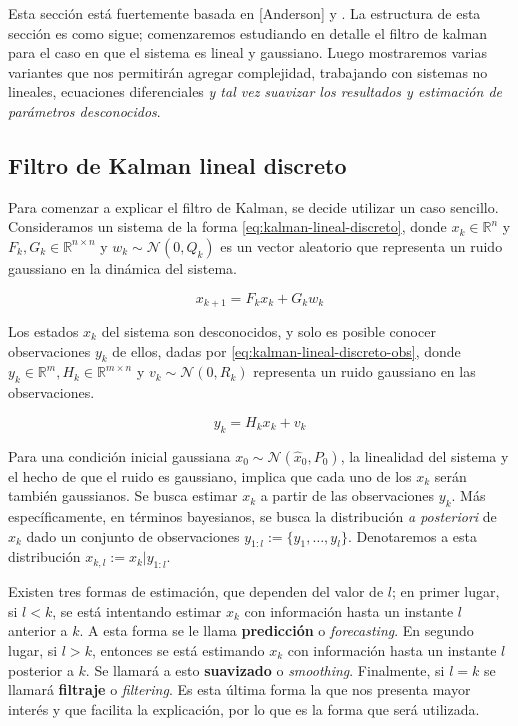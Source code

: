 Esta sección está fuertemente basada en [Anderson] y \cite{Simon2006}. La estructura de esta sección es como sigue; comenzaremos estudiando en detalle el filtro de kalman para el caso en que el sistema es lineal y gaussiano. Luego mostraremos varias variantes que nos permitirán agregar complejidad, trabajando con sistemas no lineales, ecuaciones diferenciales\textit{ y tal vez suavizar los resultados y estimación de parámetros desconocidos}.

\subsection{Filtro de Kalman lineal discreto}\label{filtro-lineal}

Para comenzar a explicar el filtro de Kalman, se decide utilizar un caso sencillo. Consideramos un sistema de la forma \ref{eq:kalman-lineal-discreto}, donde \(x_k \in \mathbb{R}^{n}\) y \(F_k, G_k \in \mathbb{R}^{n \times n}\) y \(w_k \sim \mathcal{N}(0,Q_k)\) es un vector aleatorio que representa un ruido gaussiano en la dinámica del sistema. 

\begin{equation}\label{eq:kalman-lineal-discreto}
x_{k+1} = F_k x_k + G_k w_k
\end{equation}

Los estados \(x_k\) del sistema son desconocidos, y solo es posible conocer observaciones \(y_k\) de ellos, dadas por \ref{eq:kalman-lineal-discreto-obs}, donde \(y_k \in \mathbb{R}^{m}, H_k \in \mathbb{R}^{m \times n}\) y \( v_k \sim \mathcal{N}(0, R_k)\) representa un ruido gaussiano en las observaciones.

\begin{equation}\label{eq:kalman-lineal-discreto-obs}
y_k = H_k x_k  + v_k
\end{equation}


Para una condición inicial gaussiana \(x_0 \sim \mathcal{N}(\hat{x}_0, P_0)\), la linealidad del sistema y el hecho de que el ruido es gaussiano, implica que cada uno de los \(x_k\) serán también gaussianos. Se busca estimar \(x_k\) a partir de las observaciones \(y_k\). Más específicamente, en términos bayesianos, se busca la distribución \textit{a posteriori} de \(x_k\) dado un conjunto de observaciones \(y_{1:l} := \{y_1, \dots, y_l\}\). Denotaremos a esta distribución \(x_{k,l}:= x_k | y_{1:l}\).

Existen tres formas de estimación, que dependen del valor de \(l\); en primer lugar, si \(l < k\), se está intentando estimar \(x_k\) con información hasta un instante \(l\) anterior a \(k\). A esta forma se le llama \textbf{predicción} o \textit{forecasting}. En segundo lugar, si \(l>k\), entonces se está estimando \(x_k\) con información hasta un instante \(l\) posterior a \(k\). Se llamará a esto \textbf{suavizado} o \textit{smoothing}. Finalmente, si \(l = k\) se llamará \textbf{filtraje} o \textit{filtering}. Es esta última forma la que nos presenta mayor interés y que facilita la explicación, por lo que es la forma que será utilizada.

